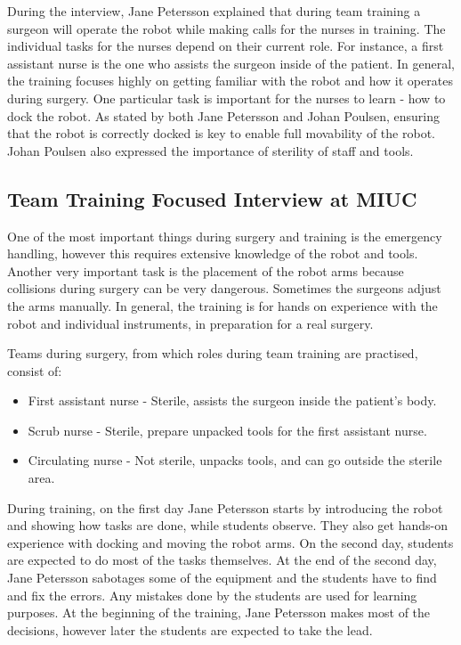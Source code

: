 During the interview, Jane Petersson explained that during team training a surgeon will operate the robot while making calls for the nurses in training. The individual tasks for the nurses depend on their current role. For instance, a first assistant nurse is the one who assists the surgeon inside of the patient. In general, the training focuses highly on getting familiar with the robot and how it operates during surgery. One particular task is important for the nurses to learn - how to dock the robot. As stated by both Jane Petersson and Johan Poulsen, ensuring that the robot is correctly docked is key to enable full movability of the robot. Johan Poulsen also expressed the importance of sterility of staff and tools.

\subsection*{Team Training Focused Interview at MIUC}
One of the most important things during surgery and training is the emergency handling, however this requires extensive knowledge of the robot and tools. Another very important task is the placement of the robot arms because collisions during surgery can be very dangerous. Sometimes the surgeons adjust the arms manually. In general, the training is for hands on experience with the robot and individual instruments, in preparation for a real surgery.

Teams during surgery, from which roles during team training are practised, consist of:
\begin{itemize}
  \item First assistant nurse - Sterile, assists the surgeon inside the patient's body.
  \item Scrub nurse - Sterile, prepare unpacked tools for the first assistant nurse.
  \item Circulating nurse - Not sterile, unpacks tools, and can go outside the sterile area.
\end{itemize}  

During training, on the first day Jane Petersson starts by introducing the robot and showing how tasks are done, while students observe. They also get hands-on experience with docking and moving the robot arms. On the second day, students are expected to do most of the tasks themselves. At the end of the second day, Jane Petersson sabotages some of the equipment and the students have to find and fix the errors. Any mistakes done by the students are used for learning purposes. At the beginning of the training, Jane Petersson makes most of the decisions, however later the students are expected to take the lead.

